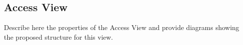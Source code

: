 \subsection{Access View}

Describe here the properties of the Access View and provide diagrams showing the proposed structure for this view.